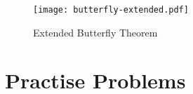 \begin{figure}[ht]
\centering
	\texttt{[image: butterfly-extended.pdf]}
	\caption{Extended Butterfly Theorem}
\end{figure}

\section{Practise Problems}


\begin{problem}


	\begin{hint}
	\addhint{}
	\addhint{}
	\end{hint}
\end{problem}

\begin{problem}


	\begin{hint}
	\addhint{}
	\addhint{}
	\end{hint}
\end{problem}

\begin{problem}


	\begin{hint}
	\addhint{}
	\addhint{}
	\end{hint}
\end{problem}

\begin{problem}


	\begin{hint}
	\addhint{}
	\addhint{}
	\end{hint}
\end{problem}

\begin{problem}


	\begin{hint}
	\addhint{}
	\addhint{}
	\end{hint}
\end{problem}

\begin{problem}


	\begin{hint}
	\addhint{}
	\addhint{}
	\end{hint}
\end{problem}

\begin{problem}


	\begin{hint}
	\addhint{}
	\addhint{}
	\end{hint}
\end{problem}